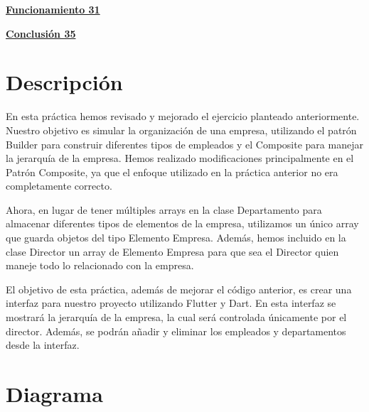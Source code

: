 \documentclass[
]{article}
\begin{document}
\hyperref[funcionamiento]{\textbf{Funcionamiento 31}}

\hyperref[conclusiuxf3n]{\textbf{Conclusión 35}}
\pagebreak
\section{Descripción}\label{descripciuxf3n}

En esta práctica hemos revisado y mejorado el ejercicio planteado
anteriormente. Nuestro objetivo es simular la organización de una
empresa, utilizando el patrón Builder para construir diferentes tipos de
empleados y el Composite para manejar la jerarquía de la empresa. Hemos
realizado modificaciones principalmente en el Patrón Composite, ya que
el enfoque utilizado en la práctica anterior no era completamente
correcto.

Ahora, en lugar de tener múltiples arrays en la clase Departamento para
almacenar diferentes tipos de elementos de la empresa, utilizamos un
único array que guarda objetos del tipo Elemento Empresa. Además, hemos
incluido en la clase Director un array de Elemento Empresa para que sea
el Director quien maneje todo lo relacionado con la empresa.

El objetivo de esta práctica, además de mejorar el código anterior, es
crear una interfaz para nuestro proyecto utilizando Flutter y Dart. En
esta interfaz se mostrará la jerarquía de la empresa, la cual será
controlada únicamente por el director. Además, se podrán añadir y
eliminar los empleados y departamentos desde la interfaz.

\section{Diagrama}\label{diagrama}
\end{document}
